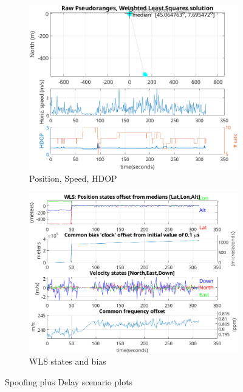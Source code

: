 \begin{figure}[h!]
            \hfill
            \begin{subfigure}{0.23\textwidth}
                \vspace{0.40cm}
                \includegraphics[width=\textwidth]{images/tests/Monte_Cappuccini/Spoofing/task6_figures/Samsung_A51_Monte_Cappuccini_fig4.png}
                \caption{Position, Speed, HDOP}
                \label{fig:Delay_c}
            \end{subfigure}
            \hfill
            \begin{subfigure}{0.23\textwidth}
                \vspace{0.40cm}
                \includegraphics[width=\textwidth]{images/tests/Monte_Cappuccini/Spoofing/task6_figures/Samsung_A51_Monte_Cappuccini_fig5.png}
                \caption{WLS states and bias}
                \label{fig:Delay_d}
            \end{subfigure}
            \vspace{0.35cm}
            \caption{Spoofing plus Delay scenario plots}
            \label{fig:delay_plots}
        \end{figure}


